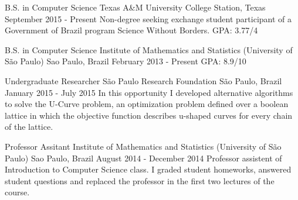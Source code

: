 \documentclass[11pt, a4paper]{awesome-cv-res}
\begin{document}
\makecvheader
\makecvfooter
  {}
  {}
  {\thepage}



\begin{cventries}
\cventry
{B.S. in Computer Science}
{Texas A\&M University}
{College Station, Texas}
{September 2015 - Present}
{Non-degree seeking exchange student participant of a Government of Brazil program Science Without Borders. \newline GPA: 3.77/4}
\newline 
\newline

\cventry
{B.S. in Computer Science} %
{Institute of Mathematics and Statistics (University of São Paulo)} %
{Sao Paulo, Brazil} %
{February 2013 - Present} %
{GPA: 8.9/10}
\end{cventries}

\begin{cventries}
\cventry
{Undergraduate Researcher}
{São Paulo Research Foundation}
{São Paulo, Brazil}
{January 2015 - July 2015}
{In this opportunity I developed alternative algorithms to solve the U-Curve problem, an optimization problem defined over a boolean lattice in which the objective function describes u-shaped curves for every chain of the lattice. }
\newline 
\newline

\cventry
{Professor Assitant} 
{Institute of Mathematics and Statistics (University of São Paulo)} 
{Sao Paulo, Brazil}
{August 2014 - December 2014}
{Professor assistent of Introduction to Computer Science class. I graded student homeworks, answered student questions and replaced the professor in the first two lectures of the course.}
\end{cventries}

\end{document}
